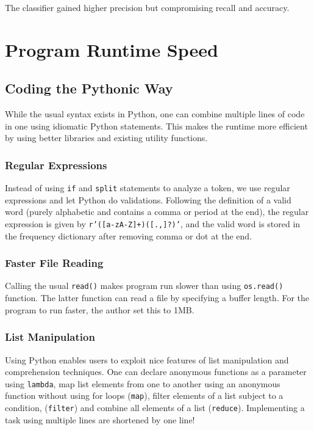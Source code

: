 \documentclass{article}
\begin{document}
The classifier gained higher precision but compromising recall and accuracy.

\section{Program Runtime Speed}

\subsection{Coding the Pythonic Way\texttrademark}
While the usual syntax exists in Python, one can combine multiple lines of code in one using idiomatic Python statements. This makes the runtime more efficient by using better libraries and existing utility functions.

\subsubsection*{Regular Expressions}
Instead of using \texttt{if} and \texttt{split} statements to analyze a token, we use regular expressions and let Python do validations. Following the definition of a valid word (purely alphabetic and contains a comma or period at the end), the regular expression is given by \texttt{r'([a-zA-Z]+)([.,]?)'}, and the valid word is stored in the frequency dictionary after removing comma or dot at the end.

\subsubsection*{Faster File Reading}
Calling the usual \texttt{read()} makes program run slower than using \texttt{os.read()} function. The latter function can read a file by specifying a buffer length. For the program to run faster, the author set this to 1MB.

\subsubsection*{List Manipulation}
Using Python enables users to exploit nice features of list manipulation and comprehension techniques\cite{bib:idpy}. One can declare anonymous functions as a parameter using \texttt{lambda}, map list elements from one to another using an anonymous function without using for loops (\texttt{map}), filter elements of a list subject to a condition, (\texttt{filter}) and combine all elements of a list (\texttt{reduce}). Implementing a task using multiple lines are shortened by one line!
\end{document}
